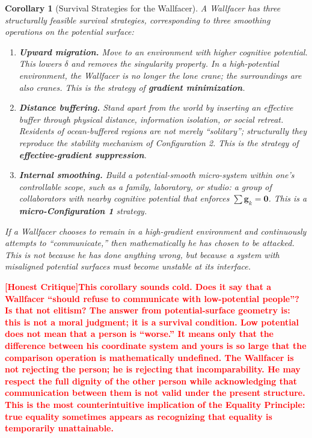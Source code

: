 \documentclass[12pt,a4paper]{article}
\newtheorem{corollary}[theorem]{Corollary}
\theoremstyle{remark}
\newcommand{\honestcrit}[1]{%
    \textcolor{red}{\textbf{[Honest Critique]#1}}%
}
\begin{document}
\begin{corollary}[Survival Strategies for the Wallfacer]\label{cor:wallfacer}
A Wallfacer has three structurally feasible survival strategies, corresponding to three smoothing operations on the potential surface:
\begin{enumerate}[label=(\arabic*)]
    \item \textbf{Upward migration.} Move to an environment with higher cognitive potential. This lowers $\delta$ and removes the singularity property. In a high-potential environment, the Wallfacer is no longer the lone crane; the surroundings are also cranes. This is the strategy of \textbf{gradient minimization}.
    \item \textbf{Distance buffering.} Stand apart from the world by inserting an effective buffer through physical distance, information isolation, or social retreat. Residents of ocean-buffered regions are not merely ``solitary''; structurally they reproduce the stability mechanism of Configuration 2. This is the strategy of \textbf{effective-gradient suppression}.
    \item \textbf{Internal smoothing.} Build a potential-smooth micro-system within one's controllable scope, such as a family, laboratory, or studio: a group of collaborators with nearby cognitive potential that enforces $\sum\mathbf{g}_k=\mathbf{0}$. This is a \textbf{micro-Configuration 1} strategy.
\end{enumerate}
If a Wallfacer chooses to remain in a high-gradient environment and continuously attempts to ``communicate,'' then mathematically he has chosen to be attacked. This is not because he has done anything wrong, but because a system with misaligned potential surfaces must become unstable at its interface.
\end{corollary}

\honestcrit{This corollary sounds cold. Does it say that a Wallfacer ``should refuse to communicate with low-potential people''? Is that not elitism? The answer from potential-surface geometry is: this is not a moral judgment; it is a survival condition. Low potential does not mean that a person is ``worse.'' It means only that the difference between his coordinate system and yours is so large that the comparison operation is mathematically undefined. The Wallfacer is not rejecting the person; he is rejecting that \textbf{incomparability}. He may respect the full dignity of the other person while acknowledging that communication between them is not valid under the present structure. This is the most counterintuitive implication of the Equality Principle: true equality sometimes appears as \textbf{recognizing that equality is temporarily unattainable}.}
\end{document}
